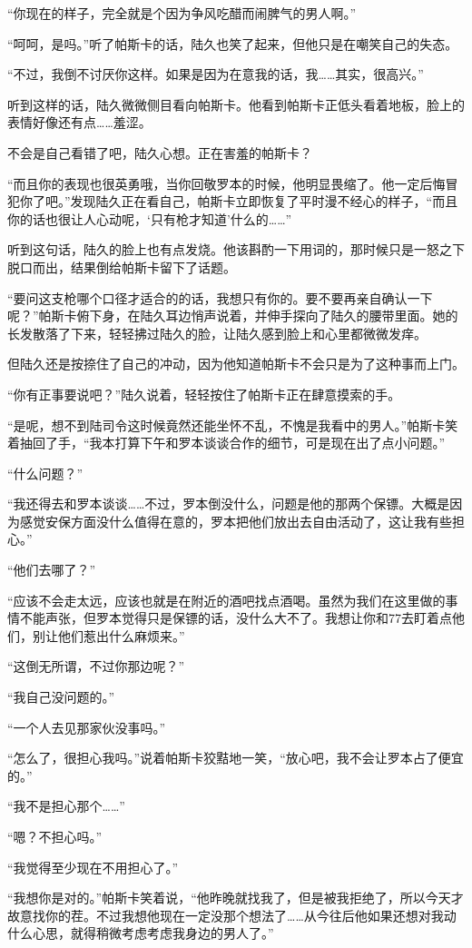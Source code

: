 “你现在的样子，完全就是个因为争风吃醋而闹脾气的男人啊。”

“呵呵，是吗。”听了帕斯卡的话，陆久也笑了起来，但他只是在嘲笑自己的失态。

“不过，我倒不讨厌你这样。如果是因为在意我的话，我……其实，很高兴。”

听到这样的话，陆久微微侧目看向帕斯卡。他看到帕斯卡正低头看着地板，脸上的表情好像还有点……羞涩。

不会是自己看错了吧，陆久心想。正在害羞的帕斯卡？

“而且你的表现也很英勇哦，当你回敬罗本的时候，他明显畏缩了。他一定后悔冒犯你了吧。”发现陆久正在看自己，帕斯卡立即恢复了平时漫不经心的样子，“而且你的话也很让人心动呢，‘只有枪才知道’什么的……”

听到这句话，陆久的脸上也有点发烧。他该斟酌一下用词的，那时候只是一怒之下脱口而出，结果倒给帕斯卡留下了话题。

“要问这支枪哪个口径才适合的的话，我想只有你的。要不要再亲自确认一下呢？”帕斯卡俯下身，在陆久耳边悄声说着，并伸手探向了陆久的腰带里面。她的长发散落了下来，轻轻拂过陆久的脸，让陆久感到脸上和心里都微微发痒。

但陆久还是按捺住了自己的冲动，因为他知道帕斯卡不会只是为了这种事而上门。

“你有正事要说吧？”陆久说着，轻轻按住了帕斯卡正在肆意摸索的手。

“是呢，想不到陆司令这时候竟然还能坐怀不乱，不愧是我看中的男人。”帕斯卡笑着抽回了手，“我本打算下午和罗本谈谈合作的细节，可是现在出了点小问题。”

“什么问题？”

“我还得去和罗本谈谈……不过，罗本倒没什么，问题是他的那两个保镖。大概是因为感觉安保方面没什么值得在意的，罗本把他们放出去自由活动了，这让我有些担心。”

“他们去哪了？”

“应该不会走太远，应该也就是在附近的酒吧找点酒喝。虽然为我们在这里做的事情不能声张，但罗本觉得只是保镖的话，没什么大不了。我想让你和77去盯着点他们，别让他们惹出什么麻烦来。”

“这倒无所谓，不过你那边呢？”

“我自己没问题的。”

“一个人去见那家伙没事吗。”

“怎么了，很担心我吗。”说着帕斯卡狡黠地一笑，“放心吧，我不会让罗本占了便宜的。”

“我不是担心那个……”

“嗯？不担心吗。”

“我觉得至少现在不用担心了。”

“我想你是对的。”帕斯卡笑着说，“他昨晚就找我了，但是被我拒绝了，所以今天才故意找你的茬。不过我想他现在一定没那个想法了……从今往后他如果还想对我动什么心思，就得稍微考虑考虑我身边的男人了。”

